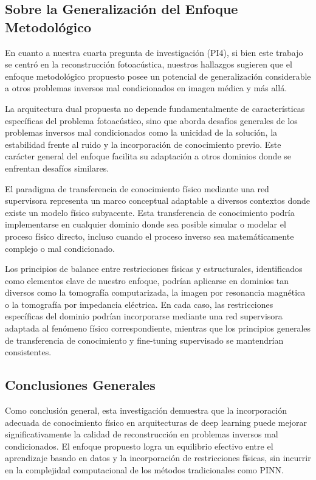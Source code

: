 \subsection{Sobre la Generalización del Enfoque Metodológico}

En cuanto a nuestra cuarta pregunta de investigación (PI4), si bien este trabajo se centró en la reconstrucción fotoacústica, nuestros hallazgos sugieren que el enfoque metodológico propuesto posee un potencial de generalización considerable a otros problemas inversos mal condicionados en imagen médica y más allá.

La arquitectura dual propuesta no depende fundamentalmente de características específicas del problema fotoacústico, sino que aborda desafíos generales de los problemas inversos mal condicionados como la unicidad de la solución, la estabilidad frente al ruido y la incorporación de conocimiento previo. Este carácter general del enfoque facilita su adaptación a otros dominios donde se enfrentan desafíos similares.

El paradigma de transferencia de conocimiento físico mediante una red supervisora representa un marco conceptual adaptable a diversos contextos donde existe un modelo físico subyacente. Esta transferencia de conocimiento podría implementarse en cualquier dominio donde sea posible simular o modelar el proceso físico directo, incluso cuando el proceso inverso sea matemáticamente complejo o mal condicionado.

Los principios de balance entre restricciones físicas y estructurales, identificados como elementos clave de nuestro enfoque, podrían aplicarse en dominios tan diversos como la tomografía computarizada, la imagen por resonancia magnética o la tomografía por impedancia eléctrica. En cada caso, las restricciones específicas del dominio podrían incorporarse mediante una red supervisora adaptada al fenómeno físico correspondiente, mientras que los principios generales de transferencia de conocimiento y fine-tuning supervisado se mantendrían consistentes.

\subsection{Conclusiones Generales}

Como conclusión general, esta investigación demuestra que la incorporación adecuada de conocimiento físico en arquitecturas de deep learning puede mejorar significativamente la calidad de reconstrucción en problemas inversos mal condicionados. El enfoque propuesto logra un equilibrio efectivo entre el aprendizaje basado en datos y la incorporación de restricciones físicas, sin incurrir en la complejidad computacional de los métodos tradicionales como PINN.

